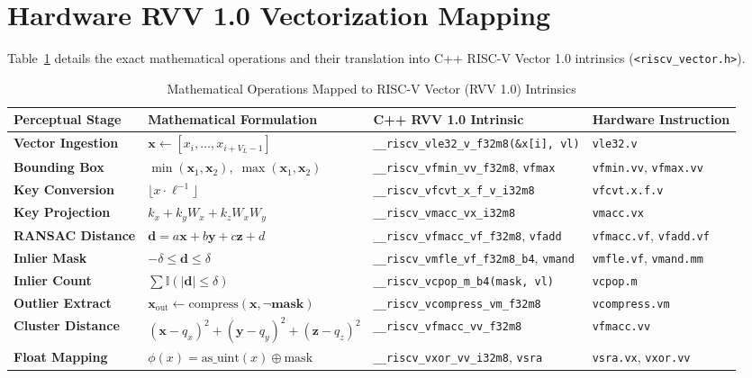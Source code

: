 \documentclass[journal,compsoc]{IEEEtran}
\begin{document}
\section{Hardware RVV 1.0 Vectorization Mapping}
\label{sec:rvv_mapping}

Table~\ref{tab:rvv_mapping} details the exact mathematical operations and their translation into C++ RISC-V Vector 1.0 intrinsics (\texttt{<riscv\_vector.h>}).

\begin{table}[t]
\centering
\caption{Mathematical Operations Mapped to RISC-V Vector (RVV 1.0) Intrinsics}
\label{tab:rvv_mapping}
\begin{tabular}{@{}llll@{}}
\toprule
\textbf{Perceptual Stage} & \textbf{Mathematical Formulation} & \textbf{C++ RVV 1.0 Intrinsic} & \textbf{Hardware Instruction} \\ \midrule
\textbf{Vector Ingestion} & $\mathbf{x} \leftarrow [x_i, \dots, x_{i+V_L-1}]$ & \texttt{\_\_riscv\_vle32\_v\_f32m8(\&x[i], vl)} & \texttt{vle32.v} \\
\textbf{Bounding Box} & $\min(\mathbf{x}_1, \mathbf{x}_2), \; \max(\mathbf{x}_1, \mathbf{x}_2)$ & \texttt{\_\_riscv\_vfmin\_vv\_f32m8}, \texttt{vfmax} & \texttt{vfmin.vv}, \texttt{vfmax.vv} \\
\textbf{Key Conversion} & $\lfloor x \cdot \ell^{-1} \rfloor$ & \texttt{\_\_riscv\_vfcvt\_x\_f\_v\_i32m8} & \texttt{vfcvt.x.f.v} \\
\textbf{Key Projection} & $k_x + k_y W_x + k_z W_x W_y$ & \texttt{\_\_riscv\_vmacc\_vx\_i32m8} & \texttt{vmacc.vx} \\
\textbf{RANSAC Distance} & $\mathbf{d} = a\mathbf{x} + b\mathbf{y} + c\mathbf{z} + d$ & \texttt{\_\_riscv\_vfmacc\_vf\_f32m8}, \texttt{vfadd} & \texttt{vfmacc.vf}, \texttt{vfadd.vf} \\
\textbf{Inlier Mask} & $-\delta \le \mathbf{d} \le \delta$ & \texttt{\_\_riscv\_vmfle\_vf\_f32m8\_b4}, \texttt{vmand} & \texttt{vmfle.vf}, \texttt{vmand.mm} \\
\textbf{Inlier Count} & $\sum \mathbb{I}(|\mathbf{d}| \le \delta)$ & \texttt{\_\_riscv\_vcpop\_m\_b4(mask, vl)} & \texttt{vcpop.m} \\
\textbf{Outlier Extract} & $\mathbf{x}_{\text{out}} \leftarrow \text{compress}(\mathbf{x}, \neg \mathbf{mask})$ & \texttt{\_\_riscv\_vcompress\_vm\_f32m8} & \texttt{vcompress.vm} \\
\textbf{Cluster Distance} & $(\mathbf{x} - q_x)^2 + (\mathbf{y} - q_y)^2 + (\mathbf{z} - q_z)^2$ & \texttt{\_\_riscv\_vfmacc\_vv\_f32m8} & \texttt{vfmacc.vv} \\
\textbf{Float Mapping} & $\phi(x) = \text{as\_uint}(x) \oplus \text{mask}$ & \texttt{\_\_riscv\_vxor\_vv\_i32m8}, \texttt{vsra} & \texttt{vsra.vx}, \texttt{vxor.vv} \\ \bottomrule
\end{tabular}
\end{table}
\end{document}
